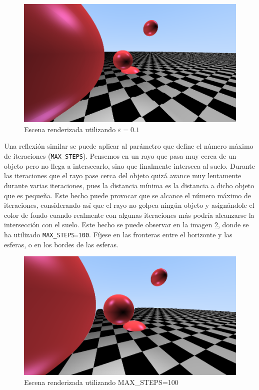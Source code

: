 \begin{figure} [ht]
    \centering
    \includegraphics[scale = 0.3]{img/C8/epsilon-grande.png}
    \caption{Escena renderizada utilizando $\varepsilon=0.1$}
    \label{fig:epsilon-grande}
\end{figure}

Una reflexión similar se puede aplicar al parámetro que define el número máximo de iteraciones (\verb|MAX_STEPS|). Pensemos en un rayo que pasa muy cerca de un objeto pero no llega a intersecarlo, sino que finalmente interseca al suelo. Durante las iteraciones que el rayo pase cerca del objeto quizá avance muy lentamente durante varias iteraciones, pues la distancia mínima es la distancia a dicho objeto que es pequeña. Este hecho puede provocar que se alcance el número máximo de iteraciones, considerando así que el rayo no golpea ningún objeto y asignándole el color de fondo cuando realmente con algunas iteraciones más podría alcanzarse la intersección con el suelo. Este hecho se puede observar en la imagen \ref{fig:pocas-iteraciones}, donde se ha utilizado \verb|MAX_STEPS=100|. Fíjese en las fronteras entre el horizonte y las esferas, o en los bordes de las esferas.

\begin{figure} [ht]
    \centering
    \includegraphics[scale = 0.3]{img/C8/pocas-iteraciones.png}
    \caption{Escena renderizada utilizando MAX\_STEPS=100}
    \label{fig:pocas-iteraciones}
\end{figure}

